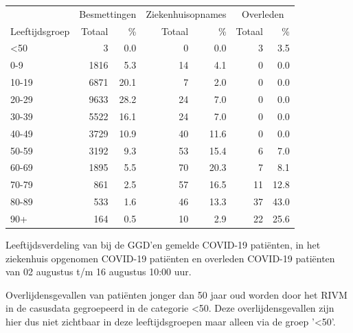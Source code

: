 \documentclass[
  english,
  man,floatsintext]{apa6}
\begin{document}
\begin{table}
\centering\begingroup\fontsize{11}{13}\selectfont

\begin{threeparttable}
\begin{tabular}{lrrrrrr}
\toprule
\multicolumn{1}{c}{ } & \multicolumn{2}{c}{Besmettingen} & \multicolumn{2}{c}{Ziekenhuisopnames} & \multicolumn{2}{c}{Overleden} \\
\cmidrule(l{3pt}r{3pt}){2-3} \cmidrule(l{3pt}r{3pt}){4-5} \cmidrule(l{3pt}r{3pt}){6-7}
Leeftijdsgroep & Totaal & \% & Totaal & \% & Totaal & \%\\
\midrule
<50 & 3 & 0.0 & 0 & 0.0 & 3 & 3.5\\
0-9 & 1816 & 5.3 & 14 & 4.1 & 0 & 0.0\\
10-19 & 6871 & 20.1 & 7 & 2.0 & 0 & 0.0\\
20-29 & 9633 & 28.2 & 24 & 7.0 & 0 & 0.0\\
30-39 & 5522 & 16.1 & 24 & 7.0 & 0 & 0.0\\
40-49 & 3729 & 10.9 & 40 & 11.6 & 0 & 0.0\\
50-59 & 3192 & 9.3 & 53 & 15.4 & 6 & 7.0\\
60-69 & 1895 & 5.5 & 70 & 20.3 & 7 & 8.1\\
70-79 & 861 & 2.5 & 57 & 16.5 & 11 & 12.8\\
80-89 & 533 & 1.6 & 46 & 13.3 & 37 & 43.0\\
90+ & 164 & 0.5 & 10 & 2.9 & 22 & 25.6\\
\bottomrule
\end{tabular}
\begin{tablenotes}
\item[1] Leeftijdsverdeling van bij de GGD’en gemelde COVID-19 patiënten, in het ziekenhuis opgenomen COVID-19 patiënten en overleden COVID-19 patiënten van 02 augustus t/m 16 augustus 10:00 uur.
\item[2] Overlijdensgevallen van patiënten jonger dan 50 jaar oud worden door het RIVM in de casusdata gegroepeerd in de categorie <50. Deze overlijdensgevallen zijn hier dus niet zichtbaar in deze leeftijdsgroepen maar alleen via de groep '<50'.
\end{tablenotes}
\end{threeparttable}
\endgroup{}
\end{table}

\newpage
\end{document}
